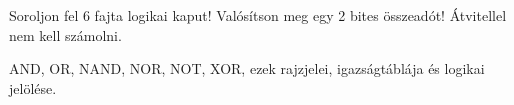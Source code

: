 \begin{example}

Soroljon fel 6 fajta logikai kaput! Valósítson meg egy 2 bites összeadót! Átvitellel nem kell számolni.

\tcbline
\vspace{1mm}

\solution

AND, OR, NAND, NOR, NOT, XOR, ezek rajzjelei, igazságtáblája és logikai jelölése.

\end{example}
